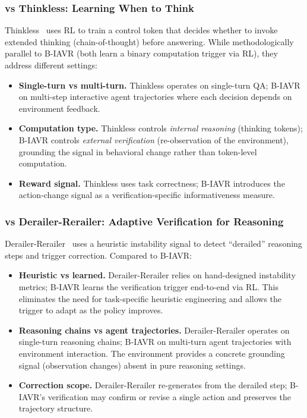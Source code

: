 \subsubsection{vs Thinkless: Learning When to Think}

Thinkless~\cite{du2025thinkless} uses RL to train a control token that decides whether to invoke extended thinking (chain-of-thought) before answering. While methodologically parallel to B-IAVR (both learn a binary computation trigger via RL), they address different settings:
\begin{itemize}
    \item \textbf{Single-turn vs multi-turn.} Thinkless operates on single-turn QA; B-IAVR on multi-step interactive agent trajectories where each decision depends on environment feedback.
    \item \textbf{Computation type.} Thinkless controls \textit{internal reasoning} (thinking tokens); B-IAVR controls \textit{external verification} (re-observation of the environment), grounding the signal in behavioral change rather than token-level computation.
    \item \textbf{Reward signal.} Thinkless uses task correctness; B-IAVR introduces the action-change signal as a verification-specific informativeness measure.
\end{itemize}

\subsubsection{vs Derailer-Rerailer: Adaptive Verification for Reasoning}

Derailer-Rerailer~\cite{wan2025derailer-rerailer} uses a heuristic instability signal to detect ``derailed'' reasoning steps and trigger correction. Compared to B-IAVR:
\begin{itemize}
    \item \textbf{Heuristic vs learned.} Derailer-Rerailer relies on hand-designed instability metrics; B-IAVR learns the verification trigger end-to-end via RL. This eliminates the need for task-specific heuristic engineering and allows the trigger to adapt as the policy improves.
    \item \textbf{Reasoning chains vs agent trajectories.} Derailer-Rerailer operates on single-turn reasoning chains; B-IAVR on multi-turn agent trajectories with environment interaction. The environment provides a concrete grounding signal (observation changes) absent in pure reasoning settings.
    \item \textbf{Correction scope.} Derailer-Rerailer re-generates from the derailed step; B-IAVR's verification may confirm or revise a single action and preserves the trajectory structure.
\end{itemize}

